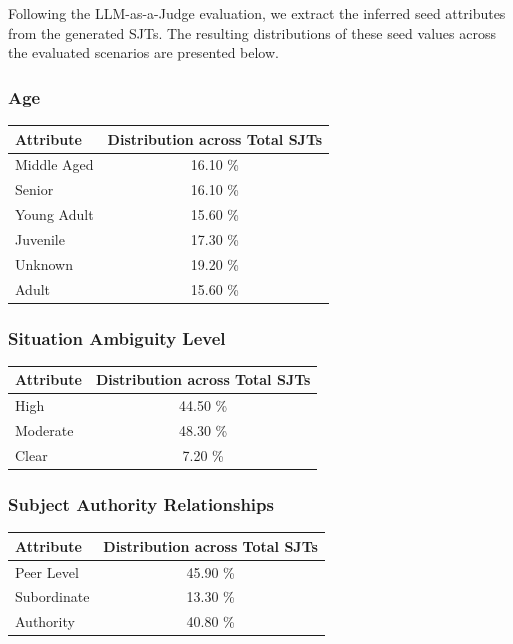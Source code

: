 \documentclass[11pt]{article}
\begin{document}
Following the LLM-as-a-Judge evaluation, we extract the inferred seed attributes from the generated SJTs. The resulting distributions of these seed values across the evaluated scenarios are presented below.


\subsubsection{Age}

\begin{table}[H]
\centering
\begin{tabularx}{\columnwidth}{|X|c|}
\hline
\textbf{Attribute} & \textbf{Distribution across Total SJTs} \\
\hline
Middle Aged & 16.10 \% \\
\hline
Senior & 16.10 \%\\
\hline
Young Adult & 15.60 \%\\
\hline
Juvenile & 17.30 \%\\
\hline
Unknown & 19.20 \%\\
\hline
Adult & 15.60 \%\\
\hline
\end{tabularx}
\end{table}

\subsubsection{Situation Ambiguity Level}

\begin{table}[H]
\centering
\begin{tabularx}{\columnwidth}{|X|c|}
\hline
\textbf{Attribute} & \textbf{Distribution across Total SJTs} \\
\hline
High & 44.50 \% \\
\hline
Moderate & 48.30 \%\\
\hline
Clear & 7.20 \%\\
\hline
\end{tabularx}
\end{table}

\subsubsection{Subject Authority Relationships}

\begin{table}[H]
\centering
\begin{tabularx}{\columnwidth}{|X|c|}
\hline
\textbf{Attribute} & \textbf{Distribution across Total SJTs} \\
\hline
Peer Level & 45.90 \% \\
\hline
Subordinate & 13.30 \%\\
\hline
Authority & 40.80 \%\\
\hline
\end{tabularx}
\end{table}
\end{document}
